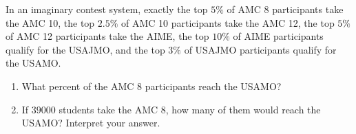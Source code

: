In an imaginary contest system, exactly the top $5\%$ of AMC 8 participants take the AMC 10, the top $2.5\%$ of AMC 10 participants take the AMC 12, the top $5\%$ of AMC 12 participants take the AIME, the top $10\%$ of AIME participants qualify for the USAJMO, and the top $3\%$ of USAJMO participants qualify for the USAMO.
\begin{enumerate}
\item[(a)] What percent of the AMC 8 participants reach the USAMO?
\item[(b)] If $39000$ students take the AMC 8, how many of them would reach the USAMO? Interpret your answer.
\end{enumerate}
